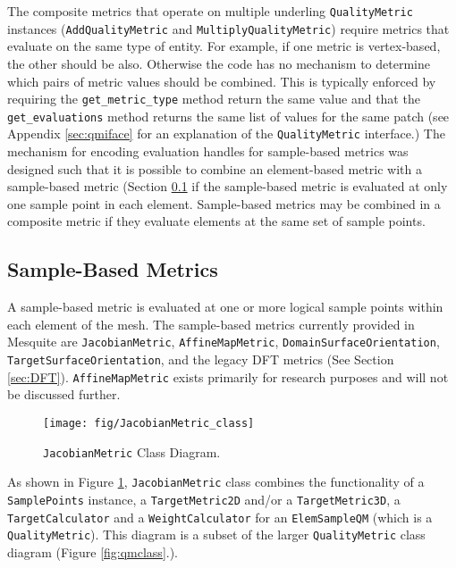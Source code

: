 \documentclass{article}
\begin{document}
The composite metrics that operate on multiple underling \texttt{QualityMetric} instances (\texttt{AddQualityMetric} and \texttt{MultiplyQualityMetric}) require metrics that evaluate on the same type of entity.  For example, if one metric is vertex-based, the other should be also.  Otherwise the code has no mechanism to determine which pairs of metric values should be combined.  This is typically enforced by requiring the \texttt{get\_metric\_type} method return the same value and that the \texttt{get\_evaluations} method returns the same list of values for the same patch (see Appendix \ref{sec:qmiface} for an explanation of the \texttt{QualityMetric} interface.)   The mechanism for encoding evaluation handles for sample-based metrics was designed such that it is possible to combine an element-based metric with a sample-based metric (Section \ref{sec:sample-metrics} if the sample-based metric is evaluated at only one sample point in each element.  Sample-based metrics may be combined in a composite metric if they evaluate elements at the same set of sample points.

\subsection{Sample-Based Metrics}
\label{sec:sample-metrics}
A sample-based metric is evaluated at one or more logical sample points within each element of the mesh. The sample-based metrics currently provided in Mesquite are \texttt{JacobianMetric}, \texttt{AffineMapMetric}, \texttt{DomainSurfaceOrientation}, \texttt{TargetSurfaceOrientation}, and the legacy DFT metrics (See Section \ref{sec:DFT}). \texttt{AffineMapMetric} exists primarily for research purposes and will not be discussed further.

\begin{figure}[htb]
\begin{center}
\texttt{[image: fig/JacobianMetric\_class]}
\caption{\texttt{JacobianMetric} Class Diagram.\label{fig:JacobianMetric}}
\end{center}
\end{figure}

As shown in Figure \ref{fig:JacobianMetric}, \texttt{JacobianMetric} class combines the functionality of a \texttt{SamplePoints} instance, a \texttt{TargetMetric2D} and/or a \texttt{TargetMetric3D}, a \texttt{TargetCalculator} and a \texttt{WeightCalculator} for an \texttt{ElemSampleQM} (which is a \texttt{QualityMetric}).  This diagram is a subset of the larger \texttt{QualityMetric} class diagram (Figure \ref{fig:qmclass}.).  
\end{document}

